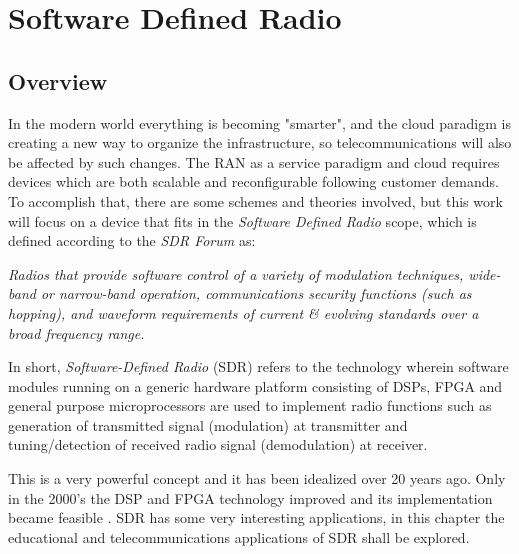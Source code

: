 \chapter{Software Defined Radio}
\label{chap:sdr}

\section{Overview}%
\label{sdr:overview}

In the modern world everything is becoming "smarter", and the cloud paradigm is
creating a new way to organize the infrastructure, so telecommunications will
also be affected by such changes. The RAN as a service  paradigm and cloud
requires devices which are both scalable and reconfigurable following customer
demands. To accomplish that, there are some schemes and theories
involved, but this work will focus on a device that fits in the \emph{Software
Defined Radio} scope, which is defined according to the \emph{SDR Forum}
\cite{web:sdrforum} as:\\

\begin{displayquote}
\textit{Radios that provide software control of a variety of modulation techniques,
wide-band or narrow-band operation, communications security functions (such as
hopping), and waveform requirements of current \& evolving standards over a
broad frequency range.}\\
\end{displayquote}

In short, \textit{Software-Defined Radio} (SDR) refers to the technology wherein
software modules running on a generic hardware platform consisting of DSPs, FPGA
and general purpose microprocessors are used to implement radio functions such
as generation of transmitted signal (modulation) at transmitter and
tuning/detection of received radio signal (demodulation) at receiver.

This is a very powerful concept and it has been idealized over 20 years ago.
Only in the 2000's the DSP and FPGA technology improved and its implementation
became feasible \cite{ladimer2009}. SDR has some very interesting applications,
in this chapter the educational and telecommunications applications of SDR shall
be explored.

